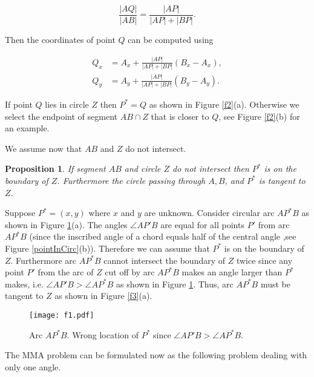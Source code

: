 \documentclass[10pt]{article}
\newtheorem{prop}[theorem]{Proposition}
\newenvironment{proof}{\begingroup\Proof}{\qed\endgroup}
\def\Proof{\noindent{\bf Proof\/:}\nobreak}
\def\qed{\unskip~{\vrule height 4pt depth 0pt width 4pt}\medbreak}
\begin{document}
\begin{equation} \label{deg2a}
\frac{|AQ|}{|AB|}=\frac{|AP|}{|AP|+|BP|}.
\end{equation}

Then the coordinates of point $Q$ can be computed using

\begin{align}
Q_x&=A_x+ \frac{|AP|}{|AP|+|BP|} (B_x-A_x), \label{qx}\\
Q_y&=A_y+ \frac{|AP|}{|AP|+|BP|} (B_y-A_y). \label{qy}
\end{align}

If point $Q$ lies in circle $Z$ then $P^*=Q$ as shown in Figure \ref{f2}(a).
Otherwise we select the endpoint of segment $AB\cap Z$ that is closer to $Q$, see Figure \ref{f2}(b) for an example.

 

We assume now that $AB$ and $Z$ do not intersect.

\begin{prop} \label{propdeg2}
If segment $AB$ and circle $Z$ do not intersect then $P^*$ is on the boundary of $Z$.
Furthermore the circle passing through $A,B$, and $P^*$ is tangent to $Z$.
\end{prop}

\begin{proof}
Suppose $P^*=(x,y)$ where $x$ and $y$ are unknown.
Consider circular arc $AP^*B$ as shown in Figure \ref{f1}(a).
The angles $\angle AP'B$ are equal for all points $P'$ from arc $AP^*B$ (since the inscribed angle of a chord equals half of the central angle ,see Figure \ref{pointInCirc}(b)). Therefore we can assume that $P^*$ is on the boundary of $Z$. Furthermore arc  $AP^*B$ cannot intersect the boundary of $Z$ twice since any point $P'$ from the arc of $Z$ cut off by arc $AP^*B$ makes an angle larger than $P^*$ makes, i.e.
$\angle AP'B>\angle AP^*B$ as shown in Figure \ref{f1}. Thus, arc $AP^*B$ must be tangent to $Z$ as shown in Figure \ref{f3}(a).
\end{proof}

\begin{figure}[htp] 
\centering
\texttt{[image: f1.pdf]}
\caption{Arc $AP^*B$. Wrong location of $P^*$ since $\angle AP'B>\angle AP^*B$.}
\label{f1}
\end{figure}








The MMA problem can be formulated now as the following problem dealing with only one angle.
\end{document}
